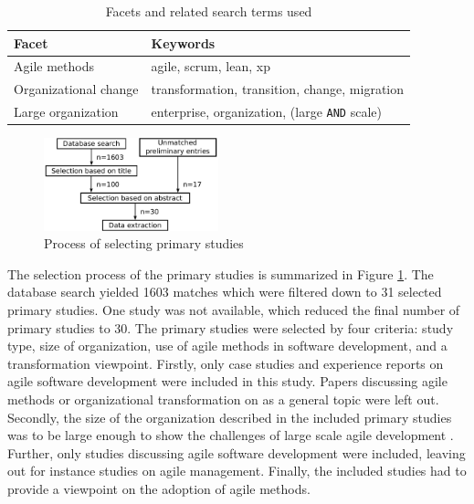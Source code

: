 \documentclass[lnbip]{svmultln}
\begin{document}
\begin{table}[t]
    \begin{tabular}{ l@{ \hskip 0.4cm } l }
        \toprule
        Facet                  & Keywords   \\ \midrule
        Agile methods          & agile, scrum, lean, xp \\ 
        Organizational change  & transformation, transition, change, migration \\
        Large organization     & enterprise, organization, (large \texttt{AND} scale) \\
        \bottomrule
    \end{tabular}
    \caption{Facets and related search terms used}
    \label{table:searchterms}
\end{table}

\begin{figure}[b]
  \begin{center}
    \includegraphics[width=0.45\textwidth]{researchprocess}
    \caption{Process of selecting primary studies}
    \label{fig:selection_process}
  \end{center}
\end{figure}

The selection process of the primary studies is summarized in Figure
\ref{fig:selection_process}. The database search yielded 1603 matches which were
filtered down to 31 selected primary studies. One study was not available, which
reduced the final number of primary studies to 30.
The primary studies were selected by four criteria: study type, size of
organization, use of agile methods in software development, and a transformation
viewpoint. Firstly, only case studies and experience reports on agile software
development were included in this study. Papers discussing agile methods or
organizational transformation on as a general topic were left out. Secondly, the
size of the organization described in the included primary studies was to be
large enough to show the challenges of large scale agile development
. Further, only studies discussing agile software
development were included, leaving out for instance studies on agile management.
Finally, the included studies had to provide a viewpoint on the adoption of
agile methods.
\end{document}
